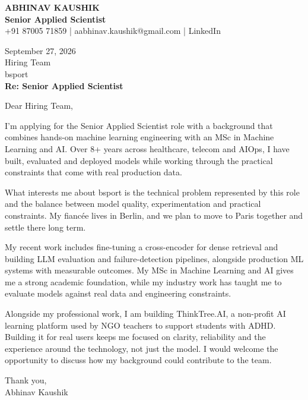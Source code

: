 \documentclass[10pt,a4paper]{article}
\begin{document}
\begin{center}
{\Large\bfseries ABHINAV KAUSHIK}\\[2pt]
{\bfseries Senior Applied Scientist}\\[2pt]
+91 87005 71859 \quad | \quad aabhinav.kaushik@gmail.com \quad | \quad LinkedIn
\end{center}
\vspace{8pt}
September 27, 2026\\[6pt]
Hiring Team\\
bsport\\[4pt]
\textbf{Re: Senior Applied Scientist}

Dear Hiring Team,

I’m applying for the Senior Applied Scientist role with a background that combines hands-on machine learning engineering with an MSc in Machine Learning and AI. Over 8+ years across healthcare, telecom and AIOps, I have built, evaluated and deployed models while working through the practical constraints that come with real production data.

What interests me about bsport is the technical problem represented by this role and the balance between model quality, experimentation and practical constraints. My fiancée lives in Berlin, and we plan to move to Paris together and settle there long term.

My recent work includes fine-tuning a cross-encoder for dense retrieval and building LLM evaluation and failure-detection pipelines, alongside production ML systems with measurable outcomes. My MSc in Machine Learning and AI gives me a strong academic foundation, while my industry work has taught me to evaluate models against real data and engineering constraints.

Alongside my professional work, I am building ThinkTree.AI, a non-profit AI learning platform used by NGO teachers to support students with ADHD. Building it for real users keeps me focused on clarity, reliability and the experience around the technology, not just the model. I would welcome the opportunity to discuss how my background could contribute to the team.

Thank you,\\
Abhinav Kaushik
\end{document}
